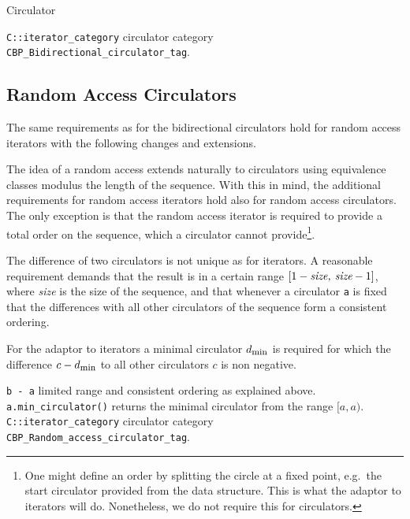 \begin{ccRefConcept}{Circulator}
\begin{tabbing}
    {\tt C::iterator\_category} \>  circulator category {\tt 
                                CBP\_Bidirectional\_circulator\_tag}.
\end{tabbing}


\subsection*{Random Access Circulators}
\label{sectionMinCircleRequ}

The same requirements as for the bidirectional circulators hold for
random access iterators with the following changes and extensions. 

The idea of a random access extends naturally to circulators using
equivalence classes modulus the length of the sequence. With this in
mind, the additional requirements for random access iterators hold
also for random access circulators. The only exception is that the
random access iterator is required to provide a total order on the
sequence, which a circulator cannot provide\footnote{One might define
  an order by splitting the circle at a fixed point, e.g.~the start
  circulator provided from the data structure. This is what the
  adaptor to iterators will do. Nonetheless, we do not require this
  for circulators.}.

The difference of two circulators is not unique as for iterators. A
reasonable requirement demands that the result is in a certain range
$[1-\mbox{{\it size, size}}-1]$, where {\it size} is the size of the
sequence, and that whenever a circulator {\tt a} is fixed that
the differences with all other circulators of the sequence form a
consistent ordering.

For the adaptor to iterators a minimal circulator
$d_{\mbox{\footnotesize min}}$ is required for which the difference $c
- d_{\mbox{\footnotesize min}}$ to all other circulators $c$ is non
negative.

\begin{tabbing}
    {\tt b - a}   \> limited range and consistent ordering 
                       as explained above.\\
    {\tt a.min\_circulator()}   \>  returns the minimal circulator from the 
                       range $[a,a)$.\\
    {\tt C::iterator\_category} \>  circulator category {\tt 
                                CBP\_Random\_access\_circulator\_tag}.
\end{tabbing}


\end{ccRefConcept}
